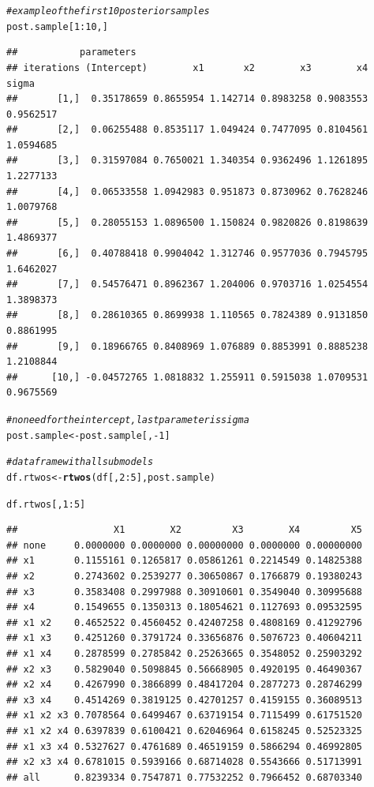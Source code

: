 \documentclass[11pt,a4paper,twoside]{book}
\makeatletter
\newcommand{\hlnum}[1]{\textcolor[rgb]{0.686,0.059,0.569}{#1}}%
\newcommand{\hlcom}[1]{\textcolor[rgb]{0.678,0.584,0.686}{\textit{#1}}}%
\newcommand{\hlopt}[1]{\textcolor[rgb]{0,0,0}{#1}}%
\newcommand{\hlstd}[1]{\textcolor[rgb]{0.345,0.345,0.345}{#1}}%
\newcommand{\hlkwb}[1]{\textcolor[rgb]{0.69,0.353,0.396}{#1}}%
\newcommand{\hlkwd}[1]{\textcolor[rgb]{0.737,0.353,0.396}{\textbf{#1}}}%
\newenvironment{kframe}{%
 \def\at@end@of@kframe{}%
 \ifinner\ifhmode%
  \def\at@end@of@kframe{\end{minipage}}%
  \begin{minipage}{\columnwidth}%
 \fi\fi%
 \def\FrameCommand##1{\hskip\@totalleftmargin \hskip-\fboxsep
 \colorbox{shadecolor}{##1}\hskip-\fboxsep
     \hskip-\linewidth \hskip-\@totalleftmargin \hskip\columnwidth}%
 \MakeFramed {\advance\hsize-\width
   \@totalleftmargin\z@ \linewidth\hsize
   \@setminipage}}%
 {\par\unskip\endMakeFramed%
 \at@end@of@kframe}
\newenvironment{knitrout}{}{} %
\makeatother
\begin{document}
\begin{knitrout}
\begin{kframe}
\begin{alltt}
\hlcom{#example of the first 10 posterior samples}
\hlstd{post.sample[}\hlnum{1}\hlopt{:}\hlnum{10}\hlstd{,]}
\end{alltt}
\begin{verbatim}
##           parameters
## iterations (Intercept)        x1       x2        x3        x4     sigma
##       [1,]  0.35178659 0.8655954 1.142714 0.8983258 0.9083553 0.9562517
##       [2,]  0.06255488 0.8535117 1.049424 0.7477095 0.8104561 1.0594685
##       [3,]  0.31597084 0.7650021 1.340354 0.9362496 1.1261895 1.2277133
##       [4,]  0.06533558 1.0942983 0.951873 0.8730962 0.7628246 1.0079768
##       [5,]  0.28055153 1.0896500 1.150824 0.9820826 0.8198639 1.4869377
##       [6,]  0.40788418 0.9904042 1.312746 0.9577036 0.7945795 1.6462027
##       [7,]  0.54576471 0.8962367 1.204006 0.9703716 1.0254554 1.3898373
##       [8,]  0.28610365 0.8699938 1.110565 0.7824389 0.9131850 0.8861995
##       [9,]  0.18966765 0.8408969 1.076889 0.8853991 0.8885238 1.2108844
##      [10,] -0.04572765 1.0818832 1.255911 0.5915038 1.0709531 0.9675569
\end{verbatim}
\begin{alltt}
\hlcom{#no need for the intercept, last parameter is sigma}
\hlstd{post.sample} \hlkwb{<-} \hlstd{post.sample[,}\hlopt{-}\hlnum{1}\hlstd{]}


\hlcom{#data frame with all submodels}
\hlstd{df.rtwos} \hlkwb{<-}\hlkwd{rtwos}\hlstd{(df[,}\hlnum{2}\hlopt{:}\hlnum{5}\hlstd{], post.sample)}

\hlstd{df.rtwos[,}\hlnum{1}\hlopt{:}\hlnum{5}\hlstd{]}
\end{alltt}
\begin{verbatim}
##                 X1        X2         X3        X4         X5
## none     0.0000000 0.0000000 0.00000000 0.0000000 0.00000000
## x1       0.1155161 0.1265817 0.05861261 0.2214549 0.14825388
## x2       0.2743602 0.2539277 0.30650867 0.1766879 0.19380243
## x3       0.3583408 0.2997988 0.30910601 0.3549040 0.30995688
## x4       0.1549655 0.1350313 0.18054621 0.1127693 0.09532595
## x1 x2    0.4652522 0.4560452 0.42407258 0.4808169 0.41292796
## x1 x3    0.4251260 0.3791724 0.33656876 0.5076723 0.40604211
## x1 x4    0.2878599 0.2785842 0.25263665 0.3548052 0.25903292
## x2 x3    0.5829040 0.5098845 0.56668905 0.4920195 0.46490367
## x2 x4    0.4267990 0.3866899 0.48417204 0.2877273 0.28746299
## x3 x4    0.4514269 0.3819125 0.42701257 0.4159155 0.36089513
## x1 x2 x3 0.7078564 0.6499467 0.63719154 0.7115499 0.61751520
## x1 x2 x4 0.6397839 0.6100421 0.62046964 0.6158245 0.52523325
## x1 x3 x4 0.5327627 0.4761689 0.46519159 0.5866294 0.46992805
## x2 x3 x4 0.6781015 0.5939166 0.68714028 0.5543666 0.51713991
## all      0.8239334 0.7547871 0.77532252 0.7966452 0.68703340
\end{verbatim}
\end{kframe}
\end{knitrout}
\end{document}
